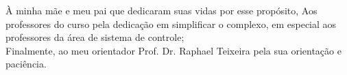 
\begin{agradecimentos}

À minha mãe e meu pai que dedicaram suas vidas por esse propósito, Aos professores do curso pela dedicação em simplificar o complexo, em especial aos professores da área de sistema de controle;\\
Finalmente, ao meu orientador Prof. Dr. Raphael Teixeira pela sua orientação e paciência.

\end{agradecimentos}
